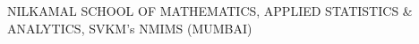 \documentclass[letterpaper,11pt]{article}
\newcommand{\resumeSubHeadingListStart}{\begin{itemize}[leftmargin=0.0in, label={}]}
\newcommand{\resumeSubHeadingListEnd}{\end{itemize}}
\newcommand\sbullet[1][.5]{\mathbin{\vcenter{\hbox{\scalebox{#1}{$\bullet$}}}}}
\begin{document}






\begin{center}
    \vspace{-5pt} 
    \small NILKAMAL SCHOOL OF MATHEMATICS, APPLIED STATISTICS \& ANALYTICS, SVKM's NMIMS (MUMBAI)
\end{center}

\end{document}
